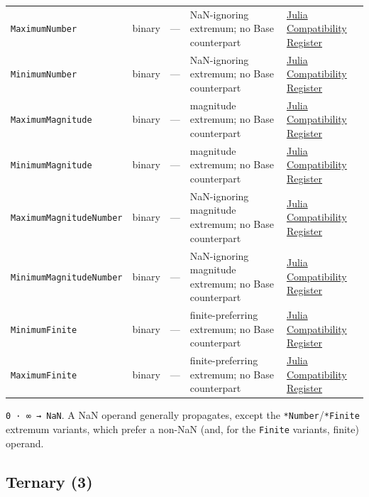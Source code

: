 \begin{table}[h]
\begin{tabulary}{\linewidth}{L L L L L}
\texttt{MaximumNumber} & binary & — & NaN-ignoring extremum; no Base counterpart & \href{reference\_\allowbreak{}julia\_\allowbreak{}compat.md}{Julia Compatibility Register} \\
\texttt{MinimumNumber} & binary & — & NaN-ignoring extremum; no Base counterpart & \href{reference\_\allowbreak{}julia\_\allowbreak{}compat.md}{Julia Compatibility Register} \\
\texttt{MaximumMagnitude} & binary & — & magnitude extremum; no Base counterpart & \href{reference\_\allowbreak{}julia\_\allowbreak{}compat.md}{Julia Compatibility Register} \\
\texttt{MinimumMagnitude} & binary & — & magnitude extremum; no Base counterpart & \href{reference\_\allowbreak{}julia\_\allowbreak{}compat.md}{Julia Compatibility Register} \\
\texttt{MaximumMagnitudeNumber} & binary & — & NaN-ignoring magnitude extremum; no Base counterpart & \href{reference\_\allowbreak{}julia\_\allowbreak{}compat.md}{Julia Compatibility Register} \\
\texttt{MinimumMagnitudeNumber} & binary & — & NaN-ignoring magnitude extremum; no Base counterpart & \href{reference\_\allowbreak{}julia\_\allowbreak{}compat.md}{Julia Compatibility Register} \\
\texttt{MinimumFinite} & binary & — & finite-preferring extremum; no Base counterpart & \href{reference\_\allowbreak{}julia\_\allowbreak{}compat.md}{Julia Compatibility Register} \\
\texttt{MaximumFinite} & binary & — & finite-preferring extremum; no Base counterpart & \href{reference\_\allowbreak{}julia\_\allowbreak{}compat.md}{Julia Compatibility Register} \\
\bottomrule
\end{tabulary}

\end{table}



\texttt{0 · ∞ → NaN}. A NaN operand generally propagates, except the \texttt{*Number}/\allowbreak\texttt{*Finite} extremum variants, which prefer a non-NaN (and, for the \texttt{Finite} variants, finite) operand.



\subsection{Ternary (3)}



